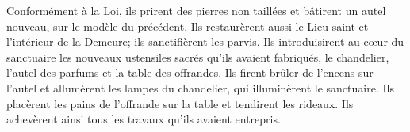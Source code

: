 Conformément à la Loi, ils prirent des pierres non taillées
	et bâtirent un autel nouveau, sur le modèle du précédent.
Ils restaurèrent aussi le Lieu saint et l’intérieur de la Demeure;
	ils sanctifièrent les parvis.
Ils introduisirent au cœur du sanctuaire
		les nouveaux ustensiles sacrés qu’ils avaient fabriqués,
	le chandelier, l’autel des parfums et la table des offrandes.
Ils firent brûler de l’encens sur l’autel
	et allumèrent les lampes du chandelier, qui illuminèrent le sanctuaire.
Ils placèrent les pains de l’offrande sur la table et tendirent les rideaux.
	Ils achevèrent ainsi tous les travaux qu’ils avaient entrepris.
